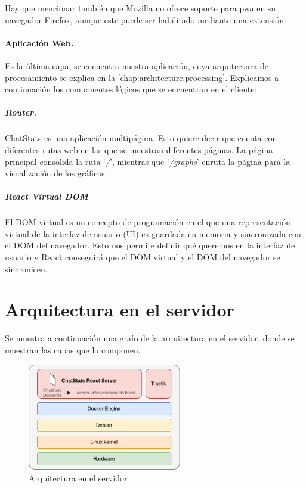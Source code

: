 Hay que mencionar también que Mozilla no ofrece soporte para \acrshort{pwa} en su navegador Firefox\cite{firefoxNoPWA}, aunque este puede ser habilitado mediante una extensión\cite{firefoxPWAextension}.

\paragraph{Aplicación Web.} Es la última capa, se encuentra nuestra aplicación, cuya arquitectura de procesamiento se explica en la \autoref{chap:architecture:processing}. Explicamos a continuación los componentes lógicos que se encuentran en el cliente:

\subparagraph{Router.} ChatStats es una aplicación multipágina. Esto quiere decir que cuenta con diferentes rutas web en las que se muestran diferentes páginas. La página principal consolida la ruta `\textit{/}', mientras que `\textit{/graphs}' enruta la página para la visualización de los gráficos.

\subparagraph{React Virtual DOM} El DOM virtual es un concepto de programación en el que una representación virtual de la interfaz de usuario (UI) es guardada en memoria y sincronizada con el DOM del navegador. Esto nos permite definir qué queremos en la interfaz de usuario y React conseguirá que el DOM virtual y el DOM del navegador se sincronicen.








\section{Arquitectura en el servidor}

Se muestra a continuación una grafo de la arquitectura en el servidor, donde se muestran las capas que lo componen.

\begin{figure}[H]
	\centering
	\includegraphics[width=0.6\textwidth]{img/server.png}
	\caption{Arquitectura en el servidor}
	\label{fig:chap4:architecture_server}
\end{figure}

